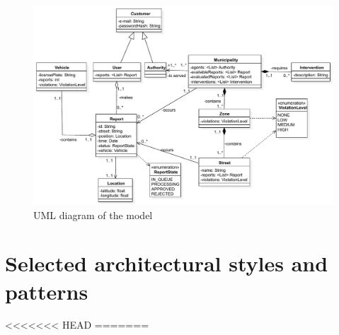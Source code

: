 \documentclass[12pt,a4paper]{report}
\begin{document}
		\begin{figure}[H]
				\includegraphics [scale = 0.7, center]{uml}
				\caption{UML diagram of the model}
		\end{figure}

		\section{Selected architectural styles and patterns}
<<<<<<< HEAD
		\newpage
=======
\end{document}
